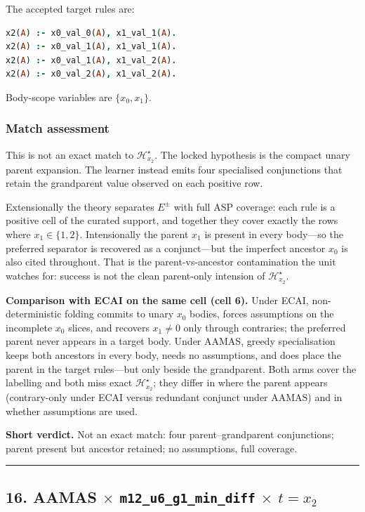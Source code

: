 \documentclass[11pt]{article}
\begin{document}
The accepted target rules are:

\begin{lstlisting}[style=logic,language=Prolog]
x2(A) :- x0_val_0(A), x1_val_1(A).
x2(A) :- x0_val_1(A), x1_val_1(A).
x2(A) :- x0_val_1(A), x1_val_2(A).
x2(A) :- x0_val_2(A), x1_val_2(A).
\end{lstlisting}

Body-scope variables are \(\{x_0,x_1\}\).

\subsubsection{Match assessment}

This is not an exact match to \(\mathcal{H}_{x_2}^\star\). The locked hypothesis is the compact unary parent expansion. The learner instead emits four specialised conjunctions that retain the grandparent value observed on each positive row.

Extensionally the theory separates \(E^\pm\) with full ASP coverage: each rule is a positive cell of the curated support, and together they cover exactly the rows where \(x_1\in\{1,2\}\). Intensionally the parent \(x_1\) is present in every body---so the preferred separator is recovered as a conjunct---but the imperfect ancestor \(x_0\) is also cited throughout. That is the parent-vs-ancestor contamination the unit watches for: success is not the clean parent-only intension of \(\mathcal{H}_{x_2}^\star\).

\textbf{Comparison with ECAI on the same cell (cell 6).} Under ECAI, non-deterministic folding commits to unary \(x_0\) bodies, forces assumptions on the incomplete \(x_0\) slices, and recovers \(x_1\neq 0\) only through contraries; the preferred parent never appears in a target body. Under AAMAS, greedy specialisation keeps both ancestors in every body, needs no assumptions, and does place the parent in the target rules---but only beside the grandparent. Both arms cover the labelling and both miss exact \(\mathcal{H}_{x_2}^\star\); they differ in where the parent appears (contrary-only under ECAI versus redundant conjunct under AAMAS) and in whether assumptions are used.

\textbf{Short verdict.} Not an exact match: four parent--grandparent conjunctions; parent present but ancestor retained; no assumptions, full coverage.

\medskip\hrule\medskip

\subsection{\texorpdfstring{16. AAMAS \(\times\) \texttt{m12\_u6\_g1\_min\_diff} \(\times\) \(t=x_2\)}{16. AAMAS - m12-u6-g1-min-diff - target x2}}
\end{document}
